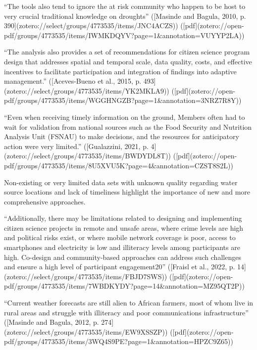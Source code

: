 {“The tools also tend to ignore the at risk community who happen to be host to very crucial traditional knowledge on droughts” ([Masinde and Bagula, 2010, p. 390](zotero://select/groups/4773535/items/JNC4ACZS)) ([pdf](zotero://open-pdf/groups/4773535/items/IWMKDQYV?page=1&annotation=VUYYP2LA))

“The analysis also provides a set of recommendations for citizen science program design that addresses spatial and temporal scale, data quality, costs, and effective incentives to facilitate participation and integration of findings into adaptive management.” ([Aceves-Bueno et al., 2015, p. 493](zotero://select/groups/4773535/items/YK2MKLA9)) ([pdf](zotero://open-pdf/groups/4773535/items/WGGHNGZB?page=1&annotation=3NRZ7R8Y))

“Even when receiving timely information on the ground, Members often had to wait for validation from national sources such as the Food Security and Nutrition Analysis Unit (FSNAU) to make decisions, and the resources for anticipatory action were very limited.” ([Gualazzini, 2021, p. 4](zotero://select/groups/4773535/items/BWDYDL8T)) ([pdf](zotero://open-pdf/groups/4773535/items/8U5XVU5K?page=4&annotation=CZST8S2L))

Non-existing or very limited data sets with unknown quality regarding water source locations and lack of timeliness highlight the importance of new and more comprehensive approaches.

“Additionally, there may be limitations related to designing and implementing citizen science projects in remote and unsafe areas, where crime levels are high and political risks exist, or where mobile network coverage is poor, access to smartphones and electricity is low and illiteracy levels among participants are high. Co-design and community-based approaches can address such challenges and ensure a high level of participant engagement20” ([Fraisl et al., 2022, p. 14](zotero://select/groups/4773535/items/FBJD7SWS)) ([pdf](zotero://open-pdf/groups/4773535/items/7WBDKYDY?page=14&annotation=MZ95QT2P))

“Current weather forecasts are still alien to African farmers, most of whom live in rural areas and struggle with illiteracy and poor communications infrastructure” ([Masinde and Bagula, 2012, p. 274](zotero://select/groups/4773535/items/EW9XSSZP)) ([pdf](zotero://open-pdf/groups/4773535/items/3WQ4S9PE?page=1&annotation=HPZC9Z65))


}

